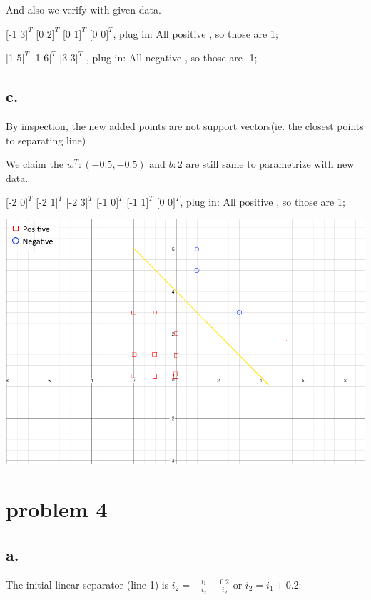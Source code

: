 \documentclass[12pt, letterpaper]{article}
\begin{document}
	And also we verify with given data.
	
	[-1 $3]^{T}$ [0 $2]^{T}$ [0 $1]^{T}$ [0 $0]^{T}$, plug in:
	All positive , so those are 1;
	
	[1 $5]^{T}$ [1 $6]^{T}$ [3 $3]^{T}$ , plug in:
	All negative , so those are -1;
	
	
	
	\subsection{c.}
	By inspection, the new added points are not support vectors(ie. the closest points to separating line)
	
	We claim the $w^{T}:(-0.5,-0.5)$ and $b:2$ are still same to parametrize with new data. 
	
	[-2 $0]^{T}$ [-2 $1]^{T}$ [-2 $3]^{T}$ [-1 $0]^{T}$ [-1 $1]^{T}$ [0 $0]^{T}$, plug in:
	All positive , so those are 1;
	
	\includegraphics[scale=0.6]{"problem-3-c"}
	
	
	\pagebreak
	\section{problem 4}
	\subsection{a.}
	The initial linear separator (line 1) is $i_2 = -\frac{i_1}{i_2} - \frac{0.2}{i_2}$ or $i_2 = i_1 + 0.2$:
	\medskip
	
\end{document}
